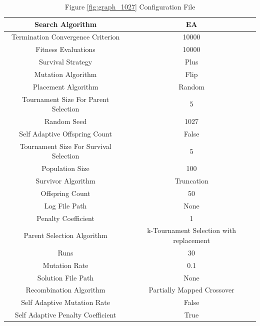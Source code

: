 \documentclass{standalone}
\begin{document}
\begin{table}[!htb]
	\centering
	\caption{Figure \ref{fig:graph_1027} Configuration File}
	\label{tab:graph_1027}
	\begin{tabular}{| c | c |}
		\hline
		Search Algorithm		& EA		 \\
		\hline
		Termination Convergence Criterion		& 10000		 \\
		\hline
		Fitness Evaluations		& 10000		 \\
		\hline
		Survival Strategy		& Plus		 \\
		\hline
		Mutation Algorithm		& Flip		 \\
		\hline
		Placement Algorithm		& Random		 \\
		\hline
		Tournament Size For Parent Selection		& 5		 \\
		\hline
		Random Seed		& 1027		 \\
		\hline
		Self Adaptive Offspring Count		& False		 \\
		\hline
		Tournament Size For Survival Selection		& 5		 \\
		\hline
		Population Size		& 100		 \\
		\hline
		Survivor Algorithm		& Truncation		 \\
		\hline
		Offspring Count		& 50		 \\
		\hline
		Log File Path		& None		 \\
		\hline
		Penalty Coefficient		& 1		 \\
		\hline
		Parent Selection Algorithm		& k-Tournament Selection with replacement		 \\
		\hline
		Runs		& 30		 \\
		\hline
		Mutation Rate		& 0.1		 \\
		\hline
		Solution File Path		& None		 \\
		\hline
		Recombination Algorithm		& Partially Mapped Crossover		 \\
		\hline
		Self Adaptive Mutation Rate		& False		 \\
		\hline
		Self Adaptive Penalty Coefficient		& True		 \\
		\hline
	\end{tabular}
\end{table}
\end{document}
